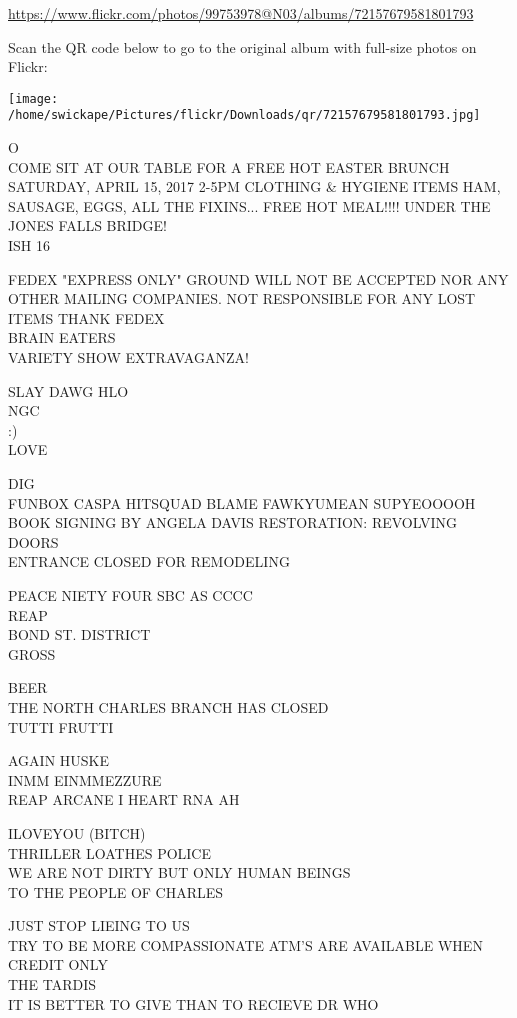 \documentclass[10pt,letterpaper]{article}
\begin{document}
\url{https://www.flickr.com/photos/99753978@N03/albums/72157679581801793}

Scan the QR code below to go to the original album with full-size photos on Flickr:

\texttt{[image: /home/swickape/Pictures/flickr/Downloads/qr/72157679581801793.jpg]}


O\\
COME SIT AT OUR TABLE FOR A FREE HOT EASTER BRUNCH SATURDAY, APRIL 15, 2017 2{-}5PM CLOTHING \& HYGIENE ITEMS HAM, SAUSAGE, EGGS, ALL THE FIXINS... FREE HOT MEAL!!!! UNDER THE JONES FALLS BRIDGE!\\
ISH 16

FEDEX "EXPRESS ONLY" GROUND WILL NOT BE ACCEPTED NOR ANY OTHER MAILING COMPANIES.  NOT RESPONSIBLE FOR ANY LOST ITEMS THANK FEDEX\\
BRAIN EATERS\\
VARIETY SHOW EXTRAVAGANZA!

SLAY DAWG HLO\\
NGC\\
:)\\
LOVE

DIG\\
FUNBOX CASPA HITSQUAD BLAME FAWKYUMEAN SUPYEOOOOH\\
BOOK SIGNING BY ANGELA DAVIS RESTORATION: REVOLVING DOORS\\
ENTRANCE CLOSED FOR REMODELING

PEACE NIETY FOUR SBC AS CCCC\\
REAP\\
BOND ST. DISTRICT\\
GROSS

BEER\\
THE NORTH CHARLES BRANCH HAS CLOSED\\
TUTTI FRUTTI

AGAIN HUSKE\\
INMM EINMMEZZURE\\
REAP ARCANE I HEART RNA AH

ILOVEYOU (BITCH)\\
THRILLER LOATHES POLICE\\
WE ARE NOT DIRTY BUT ONLY HUMAN BEINGS\\
TO THE PEOPLE OF CHARLES

JUST STOP LIEING TO US\\
TRY TO BE MORE COMPASSIONATE ATM'S ARE AVAILABLE WHEN CREDIT ONLY\\
THE TARDIS\\
IT IS BETTER TO GIVE THAN TO RECIEVE DR WHO
\end{document}
